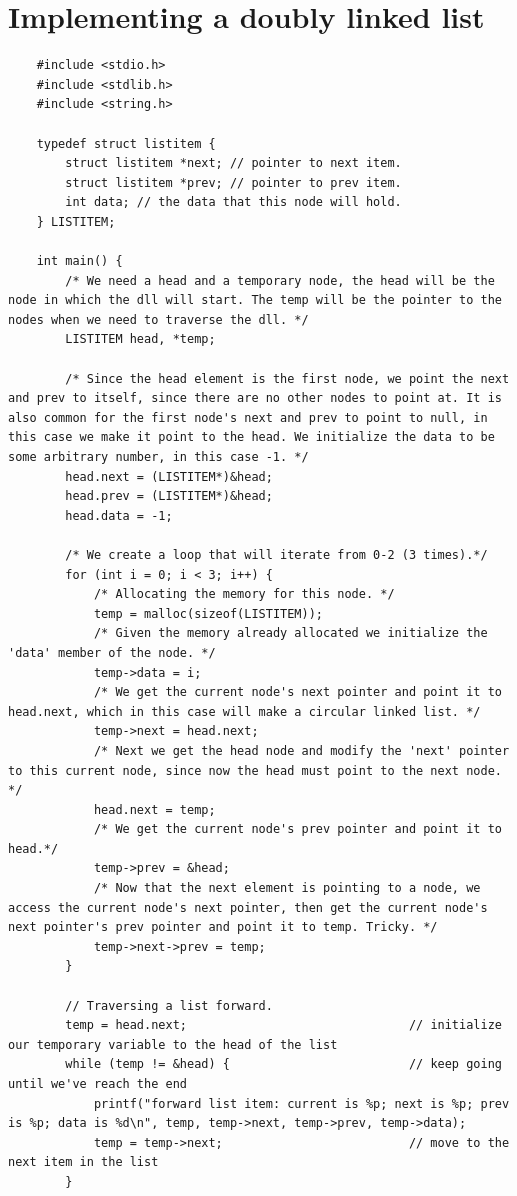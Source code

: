 \section{Implementing a doubly linked list}
\begin{verbatim}
    #include <stdio.h>
    #include <stdlib.h>
    #include <string.h>

    typedef struct listitem {
        struct listitem *next; // pointer to next item.
        struct listitem *prev; // pointer to prev item.
        int data; // the data that this node will hold.
    } LISTITEM;

    int main() {
        /* We need a head and a temporary node, the head will be the node in which the dll will start. The temp will be the pointer to the nodes when we need to traverse the dll. */
        LISTITEM head, *temp;

        /* Since the head element is the first node, we point the next and prev to itself, since there are no other nodes to point at. It is also common for the first node's next and prev to point to null, in this case we make it point to the head. We initialize the data to be some arbitrary number, in this case -1. */
        head.next = (LISTITEM*)&head;
        head.prev = (LISTITEM*)&head;
        head.data = -1;
        
        /* We create a loop that will iterate from 0-2 (3 times).*/
        for (int i = 0; i < 3; i++) {
            /* Allocating the memory for this node. */
            temp = malloc(sizeof(LISTITEM));
            /* Given the memory already allocated we initialize the 'data' member of the node. */
            temp->data = i;
            /* We get the current node's next pointer and point it to head.next, which in this case will make a circular linked list. */
            temp->next = head.next;
            /* Next we get the head node and modify the 'next' pointer to this current node, since now the head must point to the next node. */
            head.next = temp;
            /* We get the current node's prev pointer and point it to head.*/
            temp->prev = &head;
            /* Now that the next element is pointing to a node, we access the current node's next pointer, then get the current node's next pointer's prev pointer and point it to temp. Tricky. */
            temp->next->prev = temp;
        }

        // Traversing a list forward.
        temp = head.next;								// initialize our temporary variable to the head of the list
        while (temp != &head) {							// keep going until we've reach the end
            printf("forward list item: current is %p; next is %p; prev is %p; data is %d\n", temp, temp->next, temp->prev, temp->data);
            temp = temp->next;							// move to the next item in the list					
        }


\end{verbatim}
